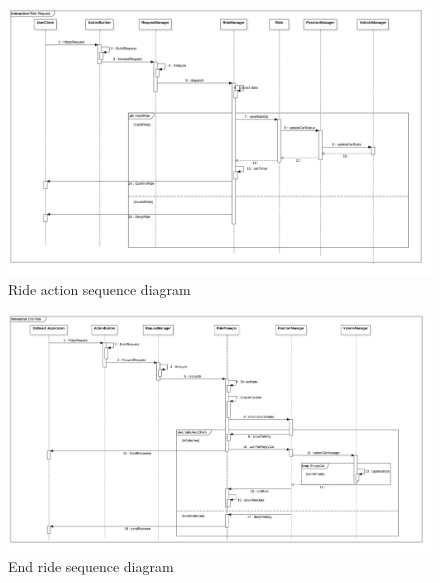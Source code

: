 \FloatBarrier
\clearpage
\FloatBarrier
\begin{figure}
\centering
\includegraphics[scale=0.4]{Images/Sequence/seq3.png}
\caption{Ride action sequence diagram}
\end{figure}
\FloatBarrier
\FloatBarrier
\begin{figure}
\centering
\includegraphics[scale=0.4]{Images/Sequence/Seq4.png}
\caption{End ride sequence diagram}
\end{figure}
\FloatBarrier




\newpage




